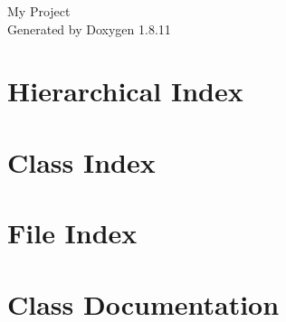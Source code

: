 \documentclass[twoside]{book}
\newcommand{\+}{\discretionary{\mbox{\scriptsize$\hookleftarrow$}}{}{}}
\newcommand{\clearemptydoublepage}{%
  \newpage{\pagestyle{empty}\cleardoublepage}%
}
\begin{document}
\hypersetup{pageanchor=false,
             bookmarksnumbered=true,
             pdfencoding=unicode
            }
\begin{titlepage}
\vspace*{7cm}
\begin{center}%
{\Large My Project }\\
\vspace*{1cm}
{\large Generated by Doxygen 1.8.11}\\
\end{center}
\end{titlepage}
\clearemptydoublepage
\tableofcontents
\clearemptydoublepage
{}
\hypersetup{pageanchor=true}

\chapter{Hierarchical Index}

\chapter{Class Index}

\chapter{File Index}

\chapter{Class Documentation}

















\end{document}
